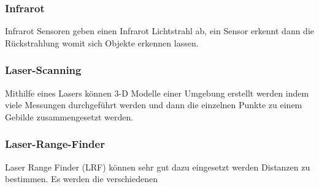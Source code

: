 \subsubsection{Infrarot}
Infrarot Sensoren geben einen Infrarot Lichtstrahl ab, ein Sensor erkennt dann die Rückstrahlung womit sich Objekte erkennen lassen. 

\subsubsection{Laser-Scanning}
Mithilfe eines Lasers können 3-D Modelle einer Umgebung erstellt werden indem viele Messungen durchgeführt werden und dann die einzelnen Punkte zu einem Gebilde zusammengesetzt werden.

\subsubsection{Laser-Range-Finder}
Laser Range Finder (LRF) können sehr gut dazu eingesetzt werden Distanzen zu bestimmen. Es werden die verschiedenen 

